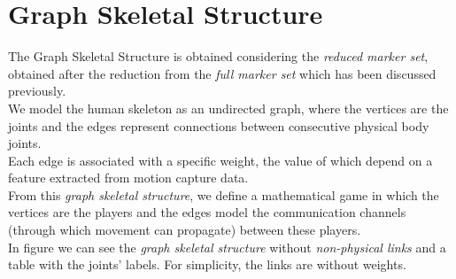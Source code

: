 \section{Graph Skeletal Structure}

The Graph Skeletal Structure is obtained considering the \textit{reduced marker set}, obtained after the reduction from the \textit{full marker set} which has been discussed previously. \\
We model the human skeleton as an undirected graph, where the vertices are the joints and the edges represent connections between consecutive physical body joints.\\
Each edge is associated with a specific weight, the value of which depend on a feature extracted from motion capture data. \\
From this \textit{graph skeletal structure}, we define a mathematical game in which the vertices are the players and the edges model the communication channels (through which movement can propagate) between these players. \\
In figure we can see the \textit{graph skeletal structure} without \textit{non-physical links} and a table with the joints' labels.
For simplicity, the links are without weights.


